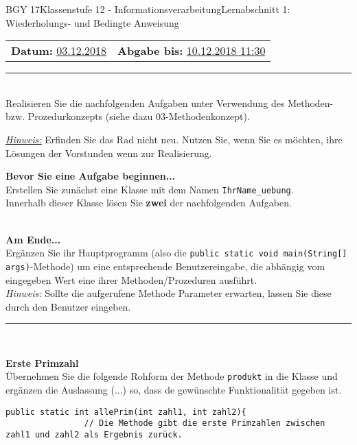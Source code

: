 \documentclass[oneside,openany,headings=optiontotoc,11pt,numbers=noenddot]{scrreprt}
\begin{document}
	\begin{worksheet}{BGY 17}{Klassenstufe 12 - Informationsverarbeitung}{Lernabschnitt 1: Wiederholungs- und Bedingte Anweisung}
				
		\noindent
		\sffamily
		\begin{tabularx}{\textwidth}{Xr}
			\textbf{Datum:} \underline{03.12.2018} & \textbf{Abgabe bis:} \underline{10.12.2018 11:30}
		\end{tabularx}
		\par\noindent
		\rule{\textwidth}{0.1pt}\\
		Realisieren Sie die nachfolgenden Aufgaben unter Verwendung des Methoden- bzw. Prozedurkonzepts (siehe dazu 03-Methodenkonzept).\\
		\par\noindent
		\underline{\textit{Hinweis:}} Erfinden Sie das Rad nicht neu. Nutzen Sie, wenn Sie es möchten, ihre Lösungen der Vorstunden wenn zur Realisierung.
		\begin{framed}
			\noindent
			\textbf{Bevor Sie eine Aufgabe beginnen...}\\
			Erstellen Sie zunächst eine Klasse mit dem Namen \lstinline[style=JavaInputStyle]|IhrName_uebung|.\\
			Innerhalb dieser Klasse lösen Sie \textbf{zwei} der nachfolgenden Aufgaben.\\
			\hdashrule{\textwidth}{0.1pt}{4pt}\\
			\par\noindent
			\textbf{Am Ende...}\\
			Ergänzen Sie ihr Hauptprogramm (also die \lstinline[style=JavaInputStyle]|public static void main(String[] args)|-Methode) um eine entsprechende Benutzereingabe, die abhängig vom eingegeben Wert eine ihrer Methoden/Prozeduren ausführt.\\
			\textit{Hinweis:} Sollte die aufgerufene Methode Parameter erwarten, lassen Sie diese durch den Benutzer eingeben.\\
			\rule{\textwidth}{1mm}\\
			\par\noindent
			\textbf{Erste Primzahl}\\
			Übernehmen Sie die folgende Rohform der Methode \lstinline[style=JavaInputStyle]|produkt| in die Klasse und ergänzen die Auslassung (...) so, dass de gewünschte Funktionalität gegeben ist.
			\begin{lstlisting}[style=JavaInputStyle]
				public static int allePrim(int zahl1, int zahl2){
				// Die Methode gibt die erste Primzahlen zwischen zahl1 und zahl2 als Ergebnis zurück.

\end{lstlisting}
\end{framed}
\end{worksheet}
\end{document}
